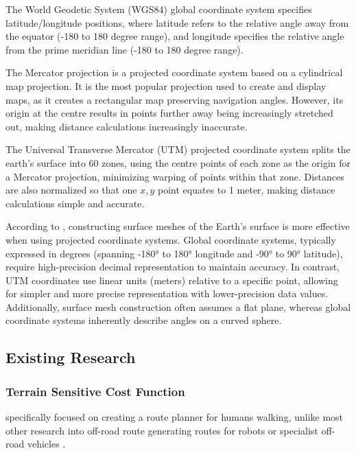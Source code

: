 \documentclass[12pt]{article}
\begin{document}
The World Geodetic System (WGS84) global coordinate system specifies latitude/longitude positions, where latitude refers to the relative angle away from the equator (-180 to 180 degree range), and longitude specifies the relative angle from the prime meridian line (-180 to 180 degree range).

The Mercator projection is a projected coordinate system based on a cylindrical map projection. It is the most popular projection used to create and display maps, as it creates a rectangular map preserving navigation angles. However, its origin at the centre results in points further away being increasingly stretched out, making distance calculations increasingly inaccurate.

The Universal Transverse Mercator (UTM) projected coordinate system splits the earth's surface into 60 zones, using the centre points of each zone as the origin for a Mercator projection, minimizing warping of points within that zone. Distances are also normalized so that one $x,y$ point equates to 1 meter, making distance calculations simple and accurate.

According to \textcite{cgal:eb-24b}, constructing surface meshes of the Earth's surface is more effective when using projected coordinate systems. Global coordinate systems, typically expressed in degrees (spanning -180° to 180° longitude and -90° to 90° latitude), require high-precision decimal representation to maintain accuracy. In contrast, UTM coordinates use linear units (meters) relative to a specific point, allowing for simpler and more precise representation with lower-precision data values. Additionally, surface mesh construction often assumes a flat plane, whereas global coordinate systems inherently describe angles on a curved sphere.

\subsection{Existing Research}

\subsubsection{Terrain Sensitive Cost Function}

\textcite{evans2023tsr} specifically focused on creating a route planner for humans walking, unlike most other research into off-road route generating routes for robots or specialist off-road vehicles \autocite{perkins2013fielddstar,zhao2024searchrescue}.
\end{document}
